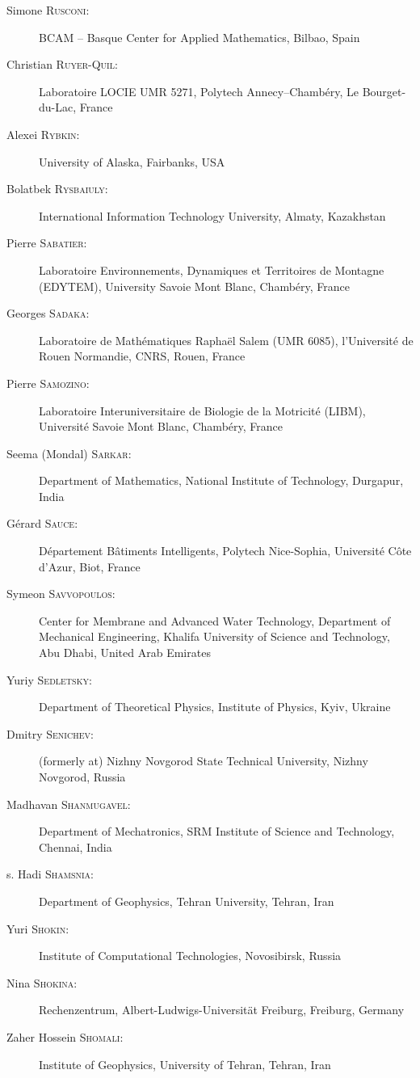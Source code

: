 \documentclass[final, a4paper, oneside, 12pt]{article}
\numberwithin{equation}{section}
\begin{document}
\begin{description}
  \item[Simone \textsc{Rusconi}:] BCAM -- Basque Center for Applied Mathematics, Bilbao, Spain
  \item[Christian \textsc{Ruyer-Quil}:] Laboratoire LOCIE UMR 5271, Polytech Annecy--Chamb\'ery, Le Bourget-du-Lac, France
  \item[Alexei \textsc{Rybkin}:] University of Alaska, Fairbanks, USA
  \item[Bolatbek \textsc{Rysbaiuly}:] International Information Technology University, Almaty, Kazakhstan
  \item[Pierre \textsc{Sabatier}:] Laboratoire Environnements, Dynamiques et Territoires de Montagne (EDYTEM), University Savoie Mont Blanc, Chamb\'ery, France
  \item[Georges \textsc{Sadaka}:] Laboratoire de Math\'ematiques Rapha\"el Salem (UMR 6085), l'Universit\'e de Rouen Normandie, CNRS, Rouen, France
  \item[Pierre \textsc{Samozino}:] Laboratoire Interuniversitaire de Biologie de la Motricit\'e (LIBM), Universit\'e Savoie Mont Blanc, Chamb\'ery, France
  \item[Seema (Mondal) \textsc{Sarkar}:] Department of Mathematics, National Institute of Technology, Durgapur, India
  \item[G\'erard \textsc{Sauce}:] D\'epartement B\^atiments Intelligents, Polytech Nice-Sophia, Universit\'e C\^ote d'Azur, Biot, France
  \item[Symeon \textsc{Savvopoulos}:] Center for Membrane and Advanced Water Technology, Department of Mechanical Engineering, Khalifa University of Science and Technology, Abu Dhabi, United Arab Emirates
  \item[Yuriy \textsc{Sedletsky}:] Department of Theoretical Physics, Institute of Physics, Kyiv, Ukraine
  \item[Dmitry \textsc{Senichev}:] (formerly at) Nizhny Novgorod State Technical University, Nizhny Novgorod, Russia
  \item[Madhavan \textsc{Shanmugavel}:] Department of Mechatronics, SRM Institute of Science and Technology, Chennai, India
  \item[s. Hadi \textsc{Shamsnia}:] Department of Geophysics, Tehran University, Tehran, Iran
  \item[Yuri \textsc{Shokin}:] Institute of Computational Technologies, Novosibirsk, Russia
  \item[Nina \textsc{Shokina}:] Rechenzentrum, Albert-Ludwigs-Universit\"at Freiburg, Freiburg, Germany
  \item[Zaher Hossein \textsc{Shomali}:] Institute of Geophysics, University of Tehran, Tehran, Iran

\end{description}
\end{document}
